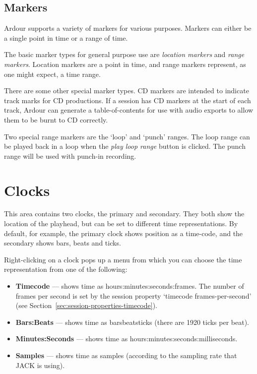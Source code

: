 \documentclass[10pt,a4paper]{book}
\begin{document}
\subsection{Markers}

Ardour supports a variety of markers for various purposes.  Markers
can either be a single point in time or a range of time.

The basic marker types for general purpose use are \emph{location
  markers} and \emph{range markers}.  Location markers are a point in
time, and range markers represent, as one might expect, a time range.  

There are some other special marker types.  CD markers are intended to
indicate track marks for CD productions.  If a session has CD markers
at the start of each track, Ardour can generate a table-of-contents
for use with audio exports to allow them to be burnt to CD correctly.

Two special range markers are the `loop' and `punch' ranges.  The loop
range can be played back in a loop when the \emph{play loop range}
button is clicked.  The punch range will be used with punch-in
recording.


\section{Clocks}

This area contains two clocks, the primary and secondary.  They both
show the location of the playhead, but can be set to different time
representations.  By default, for example, the primary clock shows
position as a time-code, and the secondary shows bars, beats and
ticks.

Right-clicking on a clock pops up a menu from which you can choose the
time representation from one of the following:

\begin{itemize}
\item \textbf{Timecode} --- shows time as
  hours:minutes:seconds:frames.  The number of frames per second is
  set by the session property `timecode frames-per-second' (see
  Section~\ref{sec:session-properties-timecode}).
\item \textbf{Bars:Beats} --- shows time as
  bars\textbar{}beats\textbar{}ticks (there are 1920 ticks per beat).
\item \textbf{Minutes:Seconds} --- shows time as
  hours:minutes:seconds:milliseconds.
\item \textbf{Samples} --- shows time as samples (according to the
  sampling rate that JACK is using).
\end{itemize}
\end{document}
